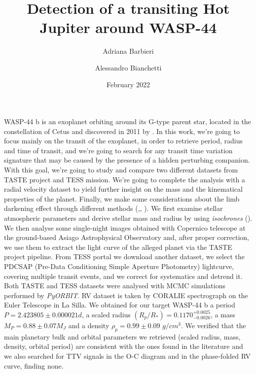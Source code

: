 \documentclass{aa}
\begin{document}
 


   \title{Detection of a transiting Hot Jupiter around WASP-44}

   \author{Adriana Barbieri
          \and
          Alessandro Bianchetti
          }

             

   \date{February 2022}

 
  \abstract
   {WASP-44 b is an exoplanet orbiting around its G-type parent star, located in the constellation of Cetus and discovered in 2011 by \cite{Anderson}.}
   {In this work, we're going to focus mainly on the transit of the exoplanet, in order to retrieve period, radius and time of transit, and we're going to search for any transit time variation signature that may be caused by the presence of a hidden perturbing companion. With this goal, we're going to study and compare two different datasets from TASTE project and TESS mission. We're going to complete the analysis with a radial velocity dataset to yield further insight on the mass and the kinematical properties of the planet. Finally, we make some considerations about the limb darkening effect through different methods (\cite{claret2011},\cite{claret2017}, \cite{claret2018}).}
   {We first examine stellar atmospheric parameters and derive stellar mass and radius by using \textit{isochrones} (\cite{Morton}). We then analyse some single-night images obtained with Copernico telescope at the ground-based Asiago Astrophysical Observatory and, after proper correction, we use them to extract the light curve of the alleged planet via the TASTE project pipeline. From TESS portal we download another dataset, we select the PDCSAP (Pre-Data Conditioning Simple Aperture Photometry) lightcurve, covering multiple transit events, and we correct for systematics and detrend it. Both TASTE and TESS datasets were analysed with MCMC simulations performed by \textit{PyORBIT}. RV dataset is taken by CORALIE spectrograph on the Euler Telescope in La Silla.}
   {We obtained for our target WASP-44 b a period $P=2.423805\pm0.000021d$, a scaled radius $(R_p/R_{*})=0.1170_{-0.0026}^{+0.0025}$, a mass $M_P=0.88\pm0.07 M_J$ and a density $\rho_p =0.99\pm0.09$ $g/cm^3$.}
   {We verified %
   that the main planetary bulk and orbital parameters we retrieved (scaled radius, mass, density, orbital period) are consistent with the ones found in the literature and we also searched for TTV signals in the O-C diagram and in the phase-folded RV curve, finding none.}
   
\end{document}
